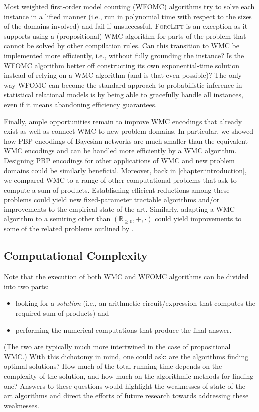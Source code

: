 Most weighted first-order model counting (WFOMC) algorithms try to solve each
instance in a lifted manner (i.e., run in polynomial time with respect to the
sizes of the domains involved) and fail if unsuccessful. \textsc{ForcLift} is an
exception as it supports using a (propositional) WMC algorithm for parts of the
problem that cannot be solved by other compilation rules. Can this transition to
WMC be implemented more efficiently, i.e., without fully grounding the instance?
Is the WFOMC algorithm better off constructing its own exponential-time solution
instead of relying on a WMC algorithm (and is that even possible)? The only way
WFOMC can become the standard approach to probabilistic inference in statistical
relational models is by being able to gracefully handle all instances, even if
it means abandoning efficiency guarantees.

Finally, ample opportunities remain to improve WMC encodings that already exist
as well as connect WMC to new problem domains. In particular, we showed how PBP
encodings of Bayesian networks are much smaller than the equivalent WMC
encodings and can be handled more efficiently by a WMC algorithm. Designing PBP
encodings for other applications of WMC and new problem domains could be
similarly beneficial. Moreover, back in \cref{chapter:introduction}, we compared
WMC to a range of other computational problems that ask to compute a sum of
products. Establishing efficient reductions among these problems could yield new
fixed-parameter tractable algorithms and/or improvements to the empirical state
of the art. Similarly, adapting a WMC algorithm to a semiring other than
$(\mathbb{R}_{\ge 0}, +, \cdot)$ could yield improvements to some of the related
problems outlined by \citet{DBLP:journals/japll/KimmigBR17}.

\subsection{Computational Complexity}

Note that the execution of both WMC and WFOMC algorithms can be divided into two
parts:
\begin{itemize}
  \item looking for a \emph{solution} (i.e., an arithmetic circuit/expression
        that computes the required sum of products) and
  \item performing the numerical computations that produce the final answer.
\end{itemize}
(The two are typically much more intertwined in the case of propositional WMC.)
With this dichotomy in mind, one could ask: are the algorithms finding optimal
solutions? How much of the total running time depends on the complexity of the
solution, and how much on the algorithmic methods for finding one? Answers to
these questions would highlight the weaknesses of state-of-the-art algorithms
and direct the efforts of future research towards addressing these weaknesses.

